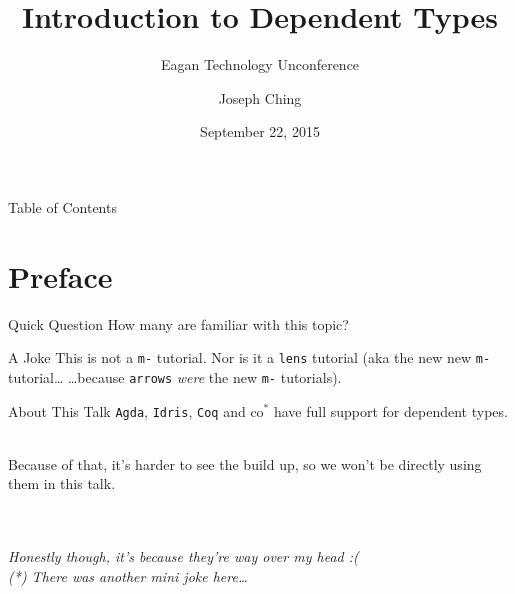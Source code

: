 \documentclass[xcolor={usenames,dvipsnames}]{beamer}
\title{Introduction to Dependent Types}
\subtitle{Eagan Technology Unconference}
\author{Joseph Ching}
\date{September 22, 2015}
\begin{document}
\begin{frame}[plain]
  \titlepage
\end{frame}


\begin{frame}{Table of Contents}
  \tableofcontents[
    pausesections,
    sectionstyle=show,
    subsectionstyle=hide
  ]
\end{frame}


\section{Preface}

\begin{frame}{Quick Question}
  How many are familiar with this topic?
\end{frame}

\begin{frame}{A Joke}
  This is not a \texttt{m-} tutorial.
  \pause
  Nor is it a \texttt{lens} tutorial
  \pause
  (aka the new new \texttt{m-} tutorial\ldots
  \pause
  \ldots because \texttt{arrows} \textit{were} the new \texttt{m-} tutorials).
\end{frame}


\begin{frame}{About This Talk}
    \texttt{Agda}, \texttt{Idris}, \texttt{Coq} and co$^*$ have full support for dependent types.

    \ \\
    \pause
    Because of that, it's harder to see the build up, so we won't be directly using them in this talk.

    \ \\
    \ \\
    \pause
    \textit{\tiny{Honestly though, it's because they're way over my head :(}}\\
    \textit{\tiny{(*) There was another mini joke here\ldots}}
\end{frame}
\end{document}
